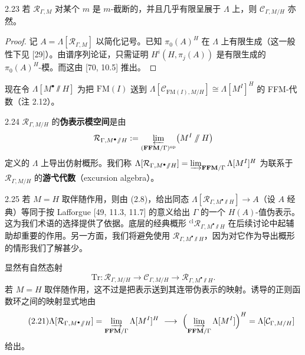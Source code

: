 \begin{prop}{2.23}
若 $\mathcal R_{\Gamma,M}$ 对某个 $m$ 是 $m$-截断的，并且几乎有限呈展于 $\Lambda$ 上，则 $\mathcal C_{\Gamma,M/H}$ 亦然。
\label{prop:zhu2-2-23}
\end{prop}

\begin{proof}
记 $A = \Lambda[\mathcal R_{\Gamma,M}]$ 以简化记号。已知 $\pi_0(A)^H$ 在 $\Lambda$ 上有限生成（这一般性下见 [29]）。由谱序列论证，只需证明 $H^i(H, \pi_j(A))$ 是有限生成的 $\pi_0(A)^H$-模。而这由 [70, 10.5] 推出。
\end{proof}

现在令 $\Lambda[M^\bullet \sslash H]$ 为把 $\mathrm{FM}(I)$ 送到 $\Lambda[\mathcal C_{\mathrm{FM}(I), M/H}] \cong \Lambda[M^I]^H$ 的 FFM-代数（注 2.12）。

\begin{defn}{2.24}
$\mathcal R_{\Gamma,M/H}$ 的\textbf{伪表示模空间}是由
\[
\mathcal R_{\Gamma, M^\bullet\sslash H} := \varprojlim_{(\mathbf{FFM}/\Gamma)^{\mathrm{op}}} \bigl(M^I \sslash H\bigr)
\]
定义的 $\Lambda$ 上导出仿射概形。我们称 $\Lambda[\mathcal R_{\Gamma,M^\bullet\sslash H}] = \varinjlim_{\mathbf{FFM}/\Gamma} \Lambda[M^I]^H$ 为联系于 $\mathcal R_{\Gamma,M/H}$ 的\textbf{游弋代数}（excursion algebra）。
\label{def:zhu2-2-24}
\end{defn}

\begin{rem}{2.25}
若 $M = H$ 取伴随作用，则由 (2.8)，给出同态 $\Lambda[\mathcal R_{\Gamma,M^\bullet\sslash H}] \to A$（设 $A$ 经典）等同于按 Lafforgue [49, 11.3, 11.7] 的意义给出 $\Gamma$ 的一个 $H(A)$-值伪表示。这为我们术语的选择提供了依据。底层的经典概形 ${}^{\mathrm{cl}}\mathcal R_{\Gamma,M^\bullet\sslash H}$ 在后续讨论中起辅助却重要的作用。另一方面，我们将避免使用 $\mathcal R_{\Gamma,M^\bullet\sslash H}$，因为对它作为导出概形的情形我们了解甚少。
\label{rem:zhu2-2-25}
\end{rem}

显然有自然态射
\begin{equation}
\tag{2.20}
\mathrm{Tr}\colon \mathcal R_{\Gamma,M/H} \longrightarrow \mathcal C_{\Gamma,M/H} \longrightarrow \mathcal R_{\Gamma,M^\bullet\sslash H}.
\end{equation}
若 $M = H$ 取伴随作用，这不过是把表示送到其连带伪表示的映射。诱导的正则函数环之间的映射显式地由
\begin{equation}
\tag{2.21}
\Lambda[\mathcal R_{\Gamma,M^\bullet\sslash H}] = \varinjlim_{\mathbf{FFM}/\Gamma}\Lambda[M^I]^H \ \longrightarrow\ \Bigl(\varinjlim_{\mathbf{FFM}/\Gamma}\Lambda[M^I]\Bigr)^{H} = \Lambda[\mathcal C_{\Gamma,M/H}]
\end{equation}
给出。

